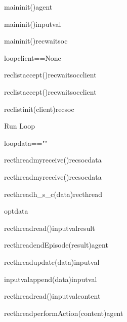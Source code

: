 \documentclass{article}
\begin{document}
\begin{figure}
\begin{sequencediagram}[.9]
		\begin{messcall}{main}{init()}{agent}{}		
		\end{messcall}		
		\begin{messcall}{main}{init()}{inputval}
		\end{messcall}
		\begin{messcall}{main}{init()}{recwaitsoc}{}		
		\end{messcall}		
		\begin{sdblock}{loop}{client==None}
			\begin{call}{reclist}{accept()}{recwaitsoc}{client}
			\end{call}
		\end{sdblock}
		\begin{call}{reclist}{accept()}{recwaitsoc}{client}
		\end{call}		
		\begin{messcall}{reclist}{init(client)}{recsoc}{}
		\end{messcall}			
		\begin{sdblock}[green!20]{Run Loop}{}
			\begin{sdblock}{loop}{data==""}
				\begin{call}{recthread}{myreceive()}{recsoc}{data}
				\end{call}		
			\end{sdblock}	
			\begin{call}{recthread}{myreceive()}{recsoc}{data}
			\end{call}					
			\begin{call}{recthread}{\small h\_s\_c(data)}{recthread}{}
				\begin{sdblock}{opt}{data}
					\begin{call}{recthread}{read()}{inputval}{result}
					\end{call}
					\begin{messcall}{recthread}{\small endEpisode(result)}{agent}
					\end{messcall}
				\end{sdblock}
			\end{call}
			\begin{messcall}{recthread}{update(data)}{inputval}{}
				\begin{call}{inputval}{\scriptsize append(data)}{inputval}{}
				\end{call}				
			\end{messcall}
			\begin{call}{recthread}{read()}{inputval}{content}
			\end{call}
			\begin{messcall}{recthread}{performAction(content)}{agent}{}
			\end{messcall}
		\end{sdblock}


\end{sequencediagram}
\end{figure}
\end{document}

